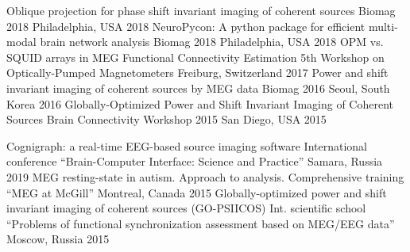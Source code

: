 \begin{cventries}
    \cvconf
    {Oblique projection for phase shift invariant imaging of coherent sources}
    {Biomag 2018}
    {Philadelphia, USA}
    {2018}
    \cvconf
    {NeuroPycon: A python package for efficient multi-modal brain network analysis}
    {Biomag 2018}
    {Philadelphia, USA}
    {2018}
    \cvconf
    {OPM vs. SQUID arrays in MEG Functional Connectivity Estimation}
    {5th Workshop on Optically-Pumped Magnetometers}
    {Freiburg, Switzerland}
    {2017}
    \cvconf
    {Power and shift invariant imaging of coherent sources by MEG data}
    {Biomag 2016}
    {Seoul, South Korea}
    {2016}
    \cvconf
    {Globally-Optimized Power and Shift Invariant Imaging of Coherent Sources}
    {Brain Connectivity Workshop 2015}
    {San Diego, USA}
    {2015}
\end{cventries}
\begin{cventries}
  \cvconf
    {Cognigraph: a real-time EEG-based source imaging software}
    {International conference ``Brain-Computer Interface: Science and Practice''}
    {Samara, Russia}
    {2019}
  \cvconf
    {MEG resting-state in autism. Approach to analysis.}
    {Comprehensive training ``MEG at McGill''}
    {Montreal, Canada}
    {2015}
  \cvconf
  {Globally-optimized power and shift invariant imaging of coherent sources (GO-PSIICOS)}
    {Int. scientific school ``Problems of functional synchronization assessment based on MEG/EEG data''}
    {Moscow, Russia}
    {2015}
\end{cventries}
